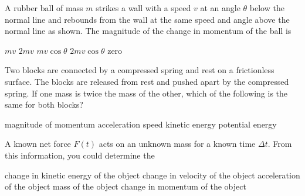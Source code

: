 \documentclass{../../../oss-apphys-exam}
\begin{document}
\begin{questions}
  \question A rubber ball of mass $m$ strikes a wall with a speed $v$ at
  an angle $\theta$ below the normal line and rebounds from the wall at the
  same speed and angle above the normal line as shown. The magnitude of the
  change in momentum of the ball is
  \begin{center}
  \end{center}
  \begin{choices}
    \choice $mv$
    \choice $2mv$
    \choice $mv\cos\theta$
    \choice $2mv\cos\theta$
      \choice zero
  \end{choices}
    
  \question Two blocks are connected by a compressed spring and rest on a
  frictionless surface. The blocks are released from rest and pushed apart by
  the compressed spring. If one mass is twice the mass of the other, which of
  the following is the same for both blocks?
  \begin{choices}
    \choice magnitude of momentum
    \choice acceleration
    \choice speed
    \choice kinetic energy
    \choice potential energy
  \end{choices}
    
  \question A known net force $F(t)$ acts on an unknown mass for a known time
  $\Delta t$. From this information, you could determine the
  \begin{choices}
    \choice change in kinetic energy of the object
    \choice change in velocity of the object
    \choice acceleration of the object
    \choice mass of the object
    \choice change in momentum of the object
  \end{choices}
    

\end{questions}
\end{document}
